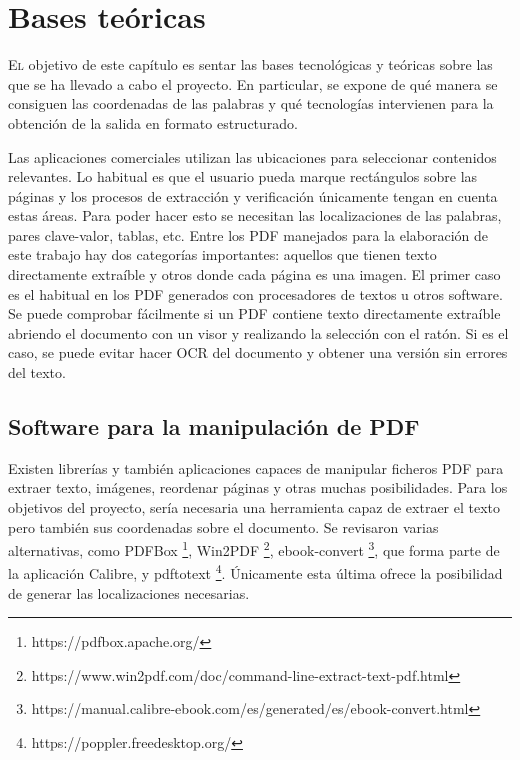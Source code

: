 
\chapter{Bases teóricas}
\label{chap:bases-teoricas}

\lettrine{E}l objetivo de este capítulo es sentar las bases tecnológicas y teóricas sobre las que se ha llevado a cabo el proyecto. En particular, se expone de qué manera se consiguen las coordenadas de las palabras y qué tecnologías intervienen para la obtención de la salida en formato estructurado.

Las aplicaciones comerciales utilizan las ubicaciones para seleccionar contenidos relevantes. Lo habitual es que el usuario pueda marque rectángulos sobre las páginas y los procesos de extracción y verificación únicamente tengan en cuenta estas áreas. Para poder hacer esto se necesitan las localizaciones de las palabras, pares clave-valor, tablas, etc. Entre los PDF manejados para la elaboración de este trabajo hay dos categorías importantes: aquellos que tienen texto directamente extraíble y otros donde cada página es una imagen. El primer caso es el habitual en los PDF generados con procesadores de textos u otros software. Se puede comprobar fácilmente si un PDF contiene texto directamente extraíble abriendo el documento con un visor y realizando la selección con el ratón. Si es el caso, se puede evitar hacer OCR del documento y obtener una versión sin errores del texto.

\section{Software para la manipulación de PDF}

Existen librerías y también aplicaciones capaces de manipular ficheros PDF para extraer texto, imágenes, reordenar páginas y otras muchas posibilidades. Para los objetivos del proyecto, sería necesaria una herramienta capaz de extraer el texto pero también sus coordenadas sobre el documento. Se revisaron varias alternativas, como PDFBox 
\footnote{https://pdfbox.apache.org/}, Win2PDF 
\footnote{https://www.win2pdf.com/doc/command-line-extract-text-pdf.html}, ebook-convert 
\footnote{https://manual.calibre-ebook.com/es/generated/es/ebook-convert.html}, que forma parte de la aplicación Calibre, y pdftotext 
\footnote{https://poppler.freedesktop.org/}. Únicamente esta última ofrece la posibilidad de generar las localizaciones necesarias.

